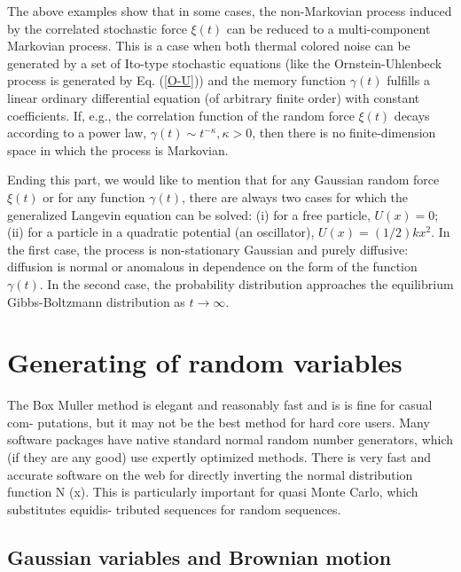 \documentclass[authoryear,draft,1p,times]{elsarticle}
\renewcommand{\=}{\stackrel{\mathrm{d}}{=}}
\begin{document}
The above examples show that in some cases, the non-Markovian 
process induced by the  correlated stochastic force $\xi(t) $  can be 
reduced to a multi-component Markovian process. 
This is a case when both 
thermal colored noise can be generated by a set of Ito-type stochastic 
 equations  (like the Ornstein-Uhlenbeck process is generated by Eq. 
(\ref{O-U}))
and the memory function $\gamma(t)$ fulfills 
a linear ordinary differential equation (of arbitrary  finite order) 
with  constant coefficients.   
If, e.g., the correlation function  of the random force $\xi(t) $ decays 
according to a power law, $\gamma(t) \sim t^{-\kappa}, \kappa > 0$, then 
there is no finite-dimension space in which 
the process is Markovian.  
 
Ending this part, we would like to mention that for any Gaussian 
random force 
$\xi(t) $ or for any function $\gamma (t)$, there are always two cases 
 for which the generalized Langevin equation can be solved:  
(i) for a free particle, $U(x)=0$;
(ii) for a particle in a quadratic potential (an oscillator), 
$U(x)=(1/2)kx^2$. 
In the first case, the process is non-stationary Gaussian 
and  purely diffusive: 
diffusion is normal or anomalous in dependence on the form of the 
function $\gamma(t)$. In the second case,  the probability distribution 
approaches the equilibrium Gibbs-Boltzmann distribution as $t \to\infty$. 

\section{Generating of random variables} 


The Box Muller method is elegant and reasonably fast and is is fine for casual com-
putations, but it may not be the best method for hard core users. Many software
packages have native standard normal random number generators, which (if they
are any good) use expertly optimized methods. There is very fast and accurate
software on the web for directly inverting the normal distribution function N (x).
This is particularly important for quasi Monte Carlo, which substitutes equidis-
tributed sequences for random sequences. 





\subsection{Gaussian variables and  Brownian motion}
\end{document}

